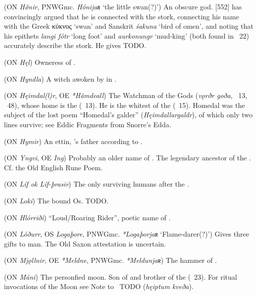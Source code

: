 \begin{itemize}
 (ON \emph{Hǿnir}, PNWGmc. \emph{Hónijaʀ} ‘the little swan(?)’)
  An obscure god. \textcite{Rydberg1886}[552] has convincingly argued that he is connected with the stork, connecting his name with the Greek \textgreek{κύκνος} ‘swan’ and Sanskrit \emph{śakuna} ‘bird of omen’, and noting that his epithets \emph{langi fótr} ‘long foot’ and \emph{aurkonungr} ‘mud-king’ (both found in \Skaldskaparmal\ 22) accurately describe the stork. He gives  TODO.

 (ON \emph{Hęl})
  Owneress of .

 (ON \emph{Hyndla})
  A witch awoken by  in \Hyndluljod.

 (ON \emph{Hęimdal(l)r}, OE \emph{*Hâmdeall})
  The Watchman of the Gods (\emph{vǫrðr goða}, \Grimnismal\ 13, \Lokasenna\ 48), whose home is the  (\Grimnismal\ 13).  He is the whitest of the  (\Thrymskvida\ 15).  Homedal was the subject of the lost poem “Homedal’s galder” (\emph{Hęimdallargaldr}), of which only two lines survive; see Eddic Fragments from Snorre’s Edda.

 (ON \emph{Hymir})
  An ettin, ’s father according to \Hymiskvida.

 (ON \emph{Yngvi}, OE \emph{Ing})
  Probably an older name of . The legendary ancestor of the . Cf. the Old English Rune Poem.

 (ON \emph{Líf ok Líf-þrasir})
  The only surviving humans after the .

 (ON \emph{Loki})
  The bound Os. TODO.

 (ON \emph{Hlórriði})
  “Loud/Roaring Rider”, poetic name of .

 (ON \emph{Lóðurr}, OS \emph{Logaþore}, PNWGmc. \emph{*Logaþorjaʀ} ‘Flame-darer(?)’)
  Gives three gifts to man.  The Old Saxon attestation is uncertain.

 (ON \emph{Mjǫllnir}, OE \emph{*Meldne}, PNWGmc. \emph{*Meldunjaʀ})
  The hammer of .

 (ON \emph{Máni})
  The personfied moon.  Son of  and brother of the  (\Vafthrudnismal\ 23).  For ritual invocations of the Moon see Note to \Havamal\ TODO (\emph{hęiptum kveða}).


\end{itemize}
